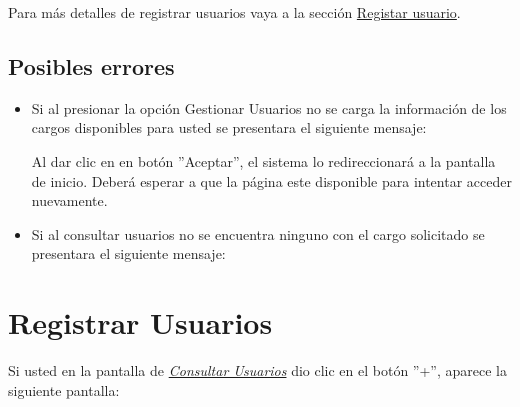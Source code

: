             Para más detalles de registrar usuarios vaya a la sección \hyperref[registrarUs]{Registar usuario}.
            
        \subsection{Posibles errores}
    	  \begin{itemize}	
            	\item Si al  presionar la opción Gestionar Usuarios no se carga la información de los cargos disponibles para usted se presentara el siguiente mensaje:
            
            
            		Al dar clic en en botón ''Aceptar'', el sistema  lo redireccionará  a la pantalla de inicio. Deberá esperar a que la página este disponible para intentar acceder nuevamente.
            
           		\item Si al consultar usuarios no se encuentra ninguno con el cargo solicitado se presentara el siguiente mensaje:
           
           \end{itemize} 
            
        

    \newpage
        
        \section{Registrar Usuarios} 
            Si usted  en la pantalla de \hyperlink{consultarUs}{\textit{Consultar Usuarios}} dio clic en el botón ''+'', aparece la siguiente pantalla:
            
